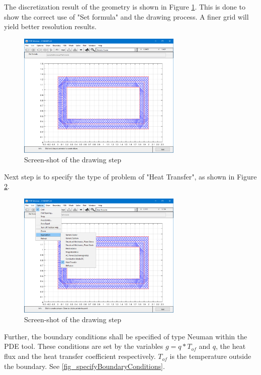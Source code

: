 \documentclass{article}
\begin{document}
The discretization result of the geometry is shown in Figure \ref{fig_discretizing}. This is done to show the correct use of  "Set formula" and the drawing process. A finer grid will yield better resolution results.

\begin{figure}[h!]
\centering
\includegraphics[width=0.70\textwidth]{./img/1_discretizing.png}
\caption{Screen-shot of the drawing step}
\label{fig_discretizing}
\end{figure}

Next step is to specify the type of problem of "Heat Transfer", as shown in Figure \ref{fig_specifyTheTypeOfProblem}.

\begin{figure}[h!]
\centering
\includegraphics[width=0.70\textwidth]{./img/2_specifyTheTypeOfProblem.png}
\caption{Screen-shot of the drawing step}
\label{fig_specifyTheTypeOfProblem}
\end{figure} 

Further, the boundary conditions shall be specified of type Neuman within the PDE tool. These conditions are set by the variables $g = q * T_{of}$ and $q$, the heat flux and the heat transfer coefficient respectively. $T_{of}$ is the temperature outside the boundary. See \ref{fig_specifyBoundaryConditions}.
\end{document}
